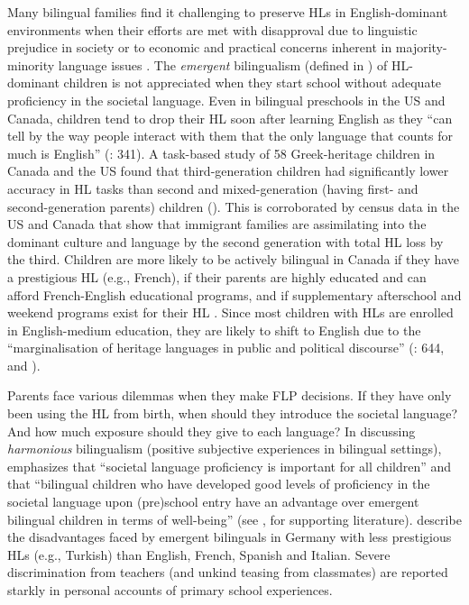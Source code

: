 \documentclass[output=paper,colorlinks,citecolor=brown]{langscibook}
\begin{document}
Many bilingual families find it challenging to preserve HLs in English-dominant environments when their efforts are met with disapproval due to linguistic prejudice in society \citep{SchroedlerEtAl2024} or to economic and practical concerns inherent in majority-minority language issues \citep{Spolsky2012}. The \textit{emergent} bilingualism (defined in \citealt{GarcíaEtAl2008}) of HL-dominant children is not appreciated when they start school without adequate proficiency in the societal language. Even in bilingual preschools in the US and Canada, children tend to drop their HL soon after learning English as they “can tell by the way people interact with them that the only language that counts for much is English” (\citealt{WongFillmore1991}: 341). A task-based study of 58 Greek-heritage children in Canada and the US found that third-generation children had significantly lower accuracy in HL tasks than second and mixed-generation (having first- and second-generation parents) children (\citealt{ChondrogianniDaskalaki2023}). This is corroborated by census data in the US \citep{AlbaEtAl2002} and Canada \citep{SchottEtAl2021} that show that immigrant families are assimilating into the dominant culture and language by the second generation with total HL loss by the third. Children are more likely to be actively bilingual in Canada if they have a prestigious HL (e.g., French), if their parents are highly educated and can afford French-English educational programs, and if supplementary afterschool and weekend programs exist for their HL \citep{Slavkov2017}. Since most children with HLs are enrolled in English-medium education, they are likely to shift to English due to the “marginalisation of heritage languages in public and political discourse” (\citealt{Meddegama2020}: 644, and \citealt{AlbaEtAl2002}).

Parents face various dilemmas when they make FLP decisions. If they have only been using the HL from birth, when should they introduce the societal language? And how much exposure should they give to each language? In discussing \textit{harmonious} bilingualism (positive subjective experiences in bilingual settings), \citet[68]{DeHouwer2020} emphasizes that “societal language proficiency is important for all children” and that “bilingual children who have developed good levels of proficiency in the societal language upon (pre)school entry have an advantage over emergent bilingual children in terms of well-being” (see \citealt{DeHouwer2020}, for supporting literature). \citet{SchroedlerEtAl2024} describe the disadvantages faced by emergent bilinguals in Germany with less prestigious HLs (e.g., Turkish) than English, French, Spanish and Italian. Severe discrimination from teachers (and unkind teasing from classmates) are reported starkly in personal accounts of primary school experiences.
\end{document}

